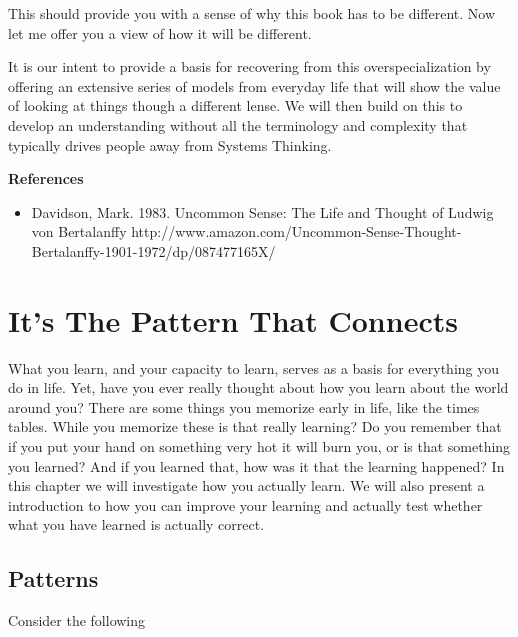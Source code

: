 \documentclass[]{memoir}
\begin{document}
This should provide you with a sense of why this book has to be
different. Now let me offer you a view of how it will be different.

It is our intent to provide a basis for recovering from this
overspecialization by offering an extensive series of models from
everyday life that will show the value of looking at things though a
different lense. We will then build on this to develop an understanding
without all the terminology and complexity that typically drives people
away from Systems Thinking.

\textbf{References}

\begin{itemize}
\itemsep1pt\parskip0pt
\item
  Davidson, Mark. 1983. Uncommon Sense: The Life and Thought of Ludwig
  von Bertalanffy
  http://www.amazon.com/Uncommon-Sense-Thought-Bertalanffy-1901-1972/dp/087477165X/
\end{itemize}

\chapter{It's The Pattern That Connects}

What you learn, and your capacity to learn, serves as a basis for
everything you do in life. Yet, have you ever really thought about how
you learn about the world around you? There are some things you memorize
early in life, like the times tables. While you memorize these is that
really learning? Do you remember that if you put your hand on something
very hot it will burn you, or is that something you learned? And if you
learned that, how was it that the learning happened? In this chapter we
will investigate how you actually learn. We will also present a
introduction to how you can improve your learning and actually test
whether what you have learned is actually correct.

\section{Patterns}

Consider the following
\end{document}
